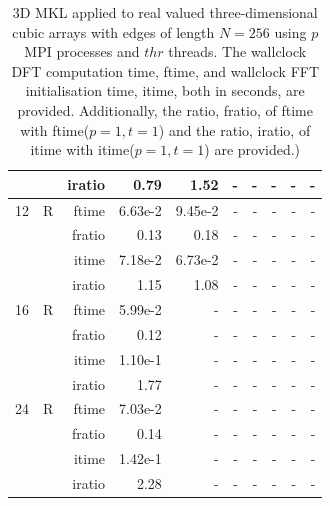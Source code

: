 \documentclass[a4paper]{article}
\begin{document}
\begin{table}[htbp]
\begin{center}
\begin{small}
\begin{tabular}{|r|r|r|r|r|r|r|r|r|r|}
             &             &  iratio &    0.79 &    1.52  &      - &      - &      - &      - &      - \\\hline
   12 &   R &   ftime &    6.63e-2 &    9.45e-2 &      - &      - &      - &      - &      - \\
             &             &  fratio &    0.13 &    0.18 &      - &      - &      - &      - &      - \\
             &             &  itime &    7.18e-2 &    6.73e-2 &      - &      - &      - &      - &      - \\
             &             &  iratio &    1.15  &    1.08  &      - &      - &      - &      - &      - \\\hline
   16 &   R &   ftime &    5.99e-2 &      - &      - &      - &      - &      - &      - \\
             &             &  fratio &   0.12 &      - &      - &      - &      - &      - &      - \\
             &             &  itime &    1.10e-1 &      - &      - &      - &      - &      - &      - \\
             &             &  iratio &   1.77  &      - &      - &      - &      - &      - &      - \\\hline
   24 &   R &   ftime &    7.03e-2 &      - &      - &      - &      - &      - &      - \\
             &             &  fratio &    0.14 &      - &      - &      - &      - &      - &      - \\
             &             &  itime &    1.42e-1 &      - &      - &      - &      - &      - &      - \\
             &             &  iratio &    2.28  &      - &      - &      - &      - &      - &      - \\\hline

\end{tabular}
\caption{3D MKL applied to real valued three-dimensional cubic arrays with edges of length $N=256$ using $p$ MPI processes and $thr$ threads. The wallclock DFT computation time, ftime, and wallclock FFT initialisation time, itime, both in seconds, are provided. Additionally, the ratio, fratio, of ftime  with ftime($p=1,t=1$) and the ratio, iratio, of itime  with itime($p=1,t=1$) are provided.) }\label{Tbl:MKL3d256}
\end{small}
\end{center}
\end{table}
\end{document}
